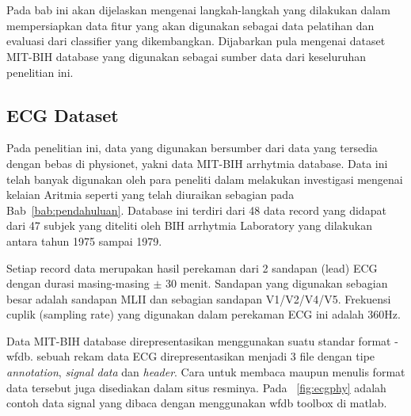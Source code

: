 \chapter{\babTiga}
Pada bab ini akan dijelaskan mengenai langkah-langkah yang dilakukan dalam
mempersiapkan data fitur yang akan digunakan sebagai data pelatihan dan evaluasi
dari classifier yang dikembangkan. Dijabarkan pula mengenai dataset MIT-BIH
database yang digunakan sebagai sumber data dari keseluruhan penelitian ini.

\section{ECG Dataset}
Pada penelitian ini, data yang digunakan bersumber dari data yang tersedia
dengan bebas di physionet, yakni data MIT-BIH arrhytmia database. Data ini telah
banyak digunakan oleh para peneliti dalam melakukan investigasi mengenai kelaian
Aritmia seperti yang telah diuraikan sebagian pada Bab~\ref{bab:pendahuluan}. Database
ini terdiri dari 48 data record yang didapat dari 47 subjek yang diteliti oleh
BIH arrhytmia Laboratory yang dilakukan antara tahun 1975 sampai 1979. 


Setiap record data merupakan hasil perekaman dari 2 sandapan (lead) ECG dengan
durasi masing-masing $\pm$ 30 menit. Sandapan yang digunakan sebagian besar
adalah sandapan MLII dan sebagian sandapan V1/V2/V4/V5. Frekuensi cuplik
(sampling rate) yang digunakan dalam perekaman ECG ini adalah 360Hz.

Data MIT-BIH database direpresentasikan menggunakan suatu standar
format - \gls{wfdb}. sebuah rekam data ECG direpresentasikan menjadi 3 file
dengan tipe \textit{annotation}, \textit{signal data} dan \textit{header}. Cara untuk
membaca maupun menulis format data tersebut juga disediakan dalam situs
resminya. Pada \pic~\ref{fig:ecgphy} adalah contoh data signal yang dibaca
dengan menggunakan \gls{wfdb} toolbox di matlab.
 

